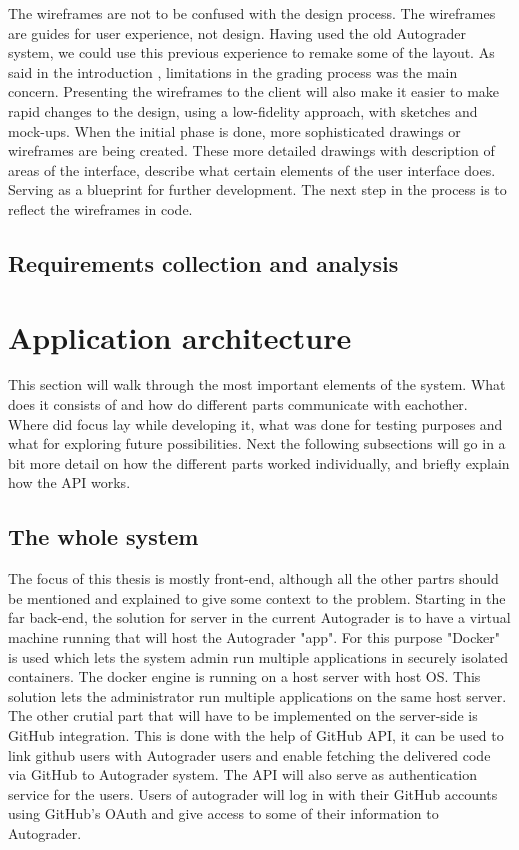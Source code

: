 The wireframes are not to be confused with the design process. The wireframes are guides for user experience, not design. Having used the old Autograder system, we could use this previous experience to remake some of the layout. As said in the introduction , limitations in the grading process was the main concern. Presenting the wireframes to the client will also make it easier to make rapid changes to the design, using a low-fidelity approach, with sketches and mock-ups. When the initial phase is done, more sophisticated drawings or wireframes are being created. These more detailed drawings with description of areas of the interface, describe what certain elements of the user interface does. Serving as a blueprint for further development. The next step in the process is to reflect the wireframes in code.

\subsection{Requirements collection and analysis}

\section{Application architecture}
This section will walk through the most important elements of the system. What does it consists of and how do different parts communicate with eachother. Where did focus lay while developing it, what was done for testing purposes and what for exploring future possibilities. Next the following subsections will go in a bit more detail on how the different parts worked individually, and briefly explain how the API works.

\subsection{The whole system}
The focus of this thesis is mostly front-end, although all the other partrs should be mentioned and explained to give some context to the problem. Starting in the far back-end, the solution for server in the current Autograder is to have a virtual machine running that will host the Autograder "app". For this purpose "Docker" \cite{docker} is used which lets the system admin run multiple applications in securely isolated containers. The docker engine is running on a host server with host OS. This solution lets the administrator run multiple applications on the same host server. The other crutial part that will have to be implemented on the server-side is GitHub integration. This is done with the help of GitHub API, it can be used to link github users with Autograder users and enable fetching the delivered code via GitHub to Autograder system. The API will also serve as authentication service for the users. Users of autograder will log in with their GitHub accounts using GitHub's OAuth \cite{githuboauth} and give access to some of their information to Autograder.

